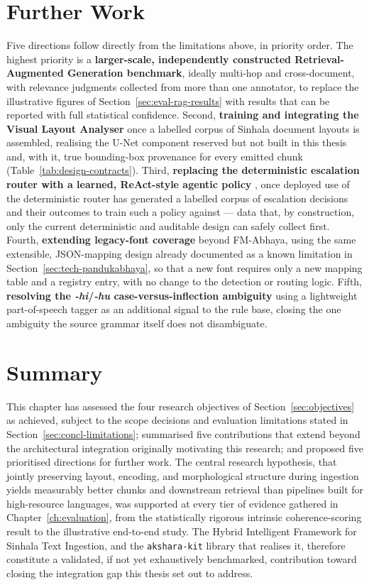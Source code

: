 \documentclass[12pt,a4paper,oneside]{report}
\begin{document}
\section{Further Work}
\label{sec:concl-further}
Five directions follow directly from the limitations above, in priority order. The highest priority is a \textbf{larger-scale, independently constructed Retrieval-Augmented Generation benchmark}, ideally multi-hop and cross-document, with relevance judgments collected from more than one annotator, to replace the illustrative figures of Section~\ref{sec:eval-rag-results} with results that can be reported with full statistical confidence. Second, \textbf{training and integrating the Visual Layout Analyser} once a labelled corpus of Sinhala document layouts is assembled, realising the U-Net component reserved but not built in this thesis and, with it, true bounding-box provenance for every emitted chunk (Table~\ref{tab:design-contracts}). Third, \textbf{replacing the deterministic escalation router with a learned, ReAct-style agentic policy} \cite{yao2023react, schick2023toolformer}, once deployed use of the deterministic router has generated a labelled corpus of escalation decisions and their outcomes to train such a policy against — data that, by construction, only the current deterministic and auditable design can safely collect first. Fourth, \textbf{extending legacy-font coverage} beyond FM-Abhaya, using the same extensible, JSON-mapping design already documented as a known limitation in Section~\ref{sec:tech-pandukabhaya}, so that a new font requires only a new mapping table and a registry entry, with no change to the detection or routing logic. Fifth, \textbf{resolving the \textit{-hi}/\textit{-hu} case-versus-inflection ambiguity} using a lightweight part-of-speech tagger as an additional signal to the rule base, closing the one ambiguity the source grammar itself does not disambiguate.

\section{Summary}
\label{sec:ch8-summary}
This chapter has assessed the four research objectives of Section~\ref{sec:objectives} as achieved, subject to the scope decisions and evaluation limitations stated in Section~\ref{sec:concl-limitations}; summarised five contributions that extend beyond the architectural integration originally motivating this research; and proposed five prioritised directions for further work. The central research hypothesis, that jointly preserving layout, encoding, and morphological structure during ingestion yields measurably better chunks and downstream retrieval than pipelines built for high-resource languages, was supported at every tier of evidence gathered in Chapter~\ref{ch:evaluation}, from the statistically rigorous intrinsic coherence-scoring result to the illustrative end-to-end study. The Hybrid Intelligent Framework for Sinhala Text Ingestion, and the \texttt{akshara-kit} library that realises it, therefore constitute a validated, if not yet exhaustively benchmarked, contribution toward closing the integration gap this thesis set out to address.
\end{document}
